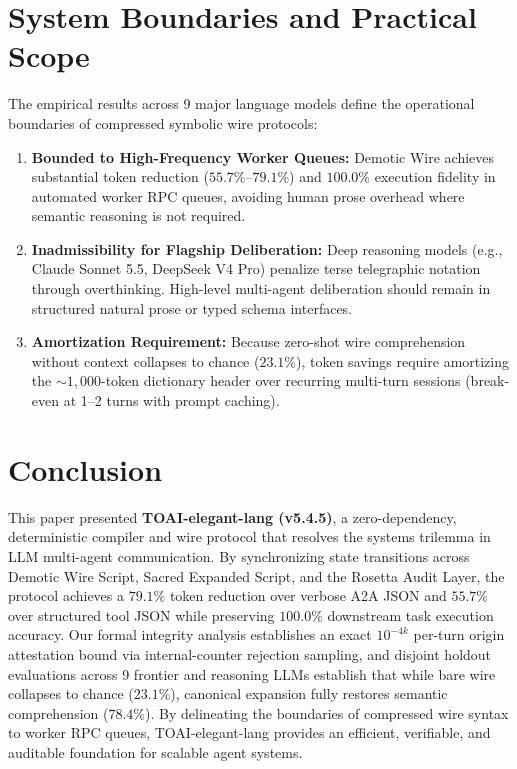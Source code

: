 \documentclass[9pt,a4paper]{extarticle}
\begin{document}
\section{System Boundaries and Practical Scope}
The empirical results across 9 major language models define the operational boundaries of compressed symbolic wire protocols:
\begin{enumerate}[leftmargin=1.4em,itemsep=2pt,topsep=2pt]
  \item \textbf{Bounded to High-Frequency Worker Queues:} Demotic Wire achieves substantial token reduction ($55.7\%$--$79.1\%$) and $100.0\%$ execution fidelity in automated worker RPC queues, avoiding human prose overhead where semantic reasoning is not required.
  \item \textbf{Inadmissibility for Flagship Deliberation:} Deep reasoning models (e.g., Claude Sonnet 5.5, DeepSeek V4 Pro) penalize terse telegraphic notation through overthinking. High-level multi-agent deliberation should remain in structured natural prose or typed schema interfaces.
  \item \textbf{Amortization Requirement:} Because zero-shot wire comprehension without context collapses to chance ($23.1\%$), token savings require amortizing the $\sim\!1{,}000$-token dictionary header over recurring multi-turn sessions (break-even at 1--2 turns with prompt caching).
\end{enumerate}

\section{Conclusion}
This paper presented \textbf{TOAI-elegant-lang (v5.4.5)}, a zero-dependency, deterministic compiler and wire protocol that resolves the systems trilemma in LLM multi-agent communication. By synchronizing state transitions across Demotic Wire Script, Sacred Expanded Script, and the Rosetta Audit Layer, the protocol achieves a $79.1\%$ token reduction over verbose A2A JSON and $55.7\%$ over structured tool JSON while preserving $100.0\%$ downstream task execution accuracy. Our formal integrity analysis establishes an exact $10^{-4k}$ per-turn origin attestation bound via internal-counter rejection sampling, and disjoint holdout evaluations across 9 frontier and reasoning LLMs establish that while bare wire collapses to chance ($23.1\%$), canonical expansion fully restores semantic comprehension ($78.4\%$).  By delineating the boundaries of compressed wire syntax to worker RPC queues, TOAI-elegant-lang provides an efficient, verifiable, and auditable foundation for scalable agent systems.
\end{document}
